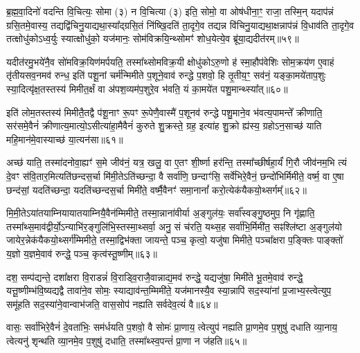 {\anuvakamend[{म॒हि॒मान॒ꣴ॒ स्वाहाप॑हत्या अध्व॒र्युर्धी॑यते॒ चतु॑र्विHꣳशतिश्च॥८॥}]}

ब्र॒ह्म॒वा॒दिनो॑ वदन्ति वि॒चित्यः॒ सोमा (३) न वि॒चित्या (३) इति॒ सोमो॒ वा ओष॑धीना॒ꣳ॒ राजा॒ तस्मि॒न् यदाप॑न्नं ग्रसि॒तमे॒वास्य॒ तद्यद्वि॑चिनु॒याद्यथा॒स्या᳚द्ग्रसि॒तं नि॑ष्खि॒दति॑ ता॒दृगे॒व तद्यन्न वि॑चिनु॒याद्यथा॒क्षन्नाप॑न्नं वि॒धाव॑ति ता॒दृगे॒व तत्क्षोधु॑को\-ऽध्व॒र्युः स्यात्क्षोधु॑को॒ यज॑मानः॒ सोम॑विक्रयि॒न्थ्सोमꣳ॑ शोध॒येत्ये॒व ब्रू॑या॒द्यदीत॑रम्॥५९॥

यदीत॑रमु॒भये॑नै॒व सो॑मविक्र॒यिण॑मर्पयति॒ तस्मा᳚थ्सोमविक्र॒यी क्षोधु॑को\-ऽरु॒णो ह॑ स्मा॒हौप॑वेशिः सोम॒क्रय॑ण ए॒वाहं तृ॑तीयसव॒नमव॑ रुन्ध॒ इति॑ पशू॒नां चर्म॑न्मिमीते प॒शूने॒वाव॑ रुन्द्धे प॒शवो॒ हि तृ॒तीय॒ꣳ॒ सव॑नं॒ यङ्का॒मये॑ताप॒शुः स्या॒दित्यृ॑क्ष॒तस्तस्य॑ मिमीत॒र्क्षं वा अ॑पश॒व्यम॑प॒शुरे॒व भ॑वति॒ यं का॒मये॑त पशु॒मान्थ्स्या᳚त्॥६०॥

इति॑ लोम॒तस्तस्य॑ मिमीतै॒तद्वै प॑शू॒नाꣳ रू॒पꣳ रू॒पेणै॒वास्मै॑ प॒शूनव॑ रुन्द्धे पशु॒माने॒व भ॑वत्य॒पामन्ते᳚ क्रीणाति॒ सर॑समे॒वैनं॑ क्रीणात्य॒मात्यो॒\-ऽसीत्या॑हा॒मैवैनं॑ कुरुते शु॒क्रस्ते॒ ग्रह॒ इत्या॑ह शु॒क्रो ह्य॑स्य॒ ग्रहो\-ऽन॒साच्छ॑ याति महि॒मान॑मे॒वास्याच्छ॑ या॒त्यन॑सा॥६१॥

अच्छ॑ याति॒ तस्मा॑दनोवा॒ह्यꣳ॑ स॒मे जीव॑नं॒ यत्र॒ खलु॒ वा ए॒तꣳ शी॒र्\mbox{}ष्णा हर॑न्ति॒ तस्मा᳚च्छीर्\mbox{}षहा॒र्यं॑ गि॒रौ जीव॑नम॒भि त्यं दे॒वꣳ स॑वि॒तार॒मित्यति॑छन्दस॒र्चा मि॑मी॒ते\-ऽति॑च्छन्दा॒ वै सर्वा॑णि॒ छन्दाꣳ॑सि॒ सर्वे॑भिरे॒वैनं॒ छन्दो॑भिर्मिमीते॒ वर्\mbox{}ष्म॒ वा ए॒षा छन्द॑सां॒ यदति॑च्छन्दा॒ यदति॑च्छन्दस॒र्चा मिमी॑ते॒ वर्\mbox{}ष्मै॒वैनꣳ॑ समा॒नानां᳚ करो॒त्येक॑यैकयो॒थ्सर्गम्᳚॥६२॥

मि॒मी॒ते\-ऽया॑तयाम्नियायातयाम्नियै॒वैन॑म्मिमीते॒ तस्मा॒न्नाना॑वीर्या अ॒ङ्गुल॑यः॒ सर्वा᳚स्वङ्गु॒ष्ठमुप॒ नि गृ॑ह्णाति॒ तस्मा᳚थ्स॒माव॑द्वीर्यो॒\-ऽन्याभि॑र॒ङ्गुलि॑भि॒स्तस्मा॒थ्सर्वा॒ अनु॒ सं च॑रति॒ यथ्स॒ह सर्वा॑भि॒र्मिमी॑त॒ सꣴश्लि॑ष्टा अ॒ङ्गुल॑यो जायेर॒न्नेक॑यैकयो॒थ्सर्ग॑म्मिमीते॒ तस्मा॒द्विभ॑क्ता जायन्ते॒ पञ्च॒ कृत्वो॒ यजु॑षा मिमीते॒ पञ्चा᳚क्षरा प॒ङ्क्तिः पाङ्क्तो॑ य॒ज्ञो य॒ज्ञमे॒वाव॑ रुन्द्धे॒ पञ्च॒ कृत्व॑स्तू॒ष्णीम्॥६३॥

दश॒ सम्प॑द्यन्ते॒ दशा᳚क्षरा वि॒राडन्नं॑ वि॒राड्वि॒राजै॒वान्नाद्य॒मव॑ रुन्द्धे॒ यद्यजु॑षा॒ मिमी॑ते भू॒तमे॒वाव॑ रुन्द्धे॒ यत्तू॒ष्णीम्भ॑वि॒ष्यद्यद्वै तावा॑ने॒व सोमः॒ स्याद्याव॑न्त॒म्मिमी॑ते॒ यज॑मानस्यै॒व स्या॒न्नापि॑ सद॒स्या॑नां प्र॒जाभ्य॒स्त्वेत्युप॒ समू॑हति सद॒स्या॑ने॒वान्वाभ॑जति॒ वास॒सोप॑ नह्यति सर्वदेव॒त्यं॑ वै॥६४॥

वासः॒ सर्वा॑भिरे॒वैनं॑ दे॒वता॑भिः॒ सम॑र्धयति प॒शवो॒ वै सोमः॑ प्रा॒णाय॒ त्वेत्युप॑ नह्यति प्रा॒णमे॒व प॒शुषु॑ दधाति व्या॒नाय॒ त्वेत्यनु॑ शृन्थति व्या॒नमे॒व प॒शुषु॑ दधाति॒ तस्मा᳚थ्स्व॒पन्तं॑ प्रा॒णा न ज॑हति॥६५॥

